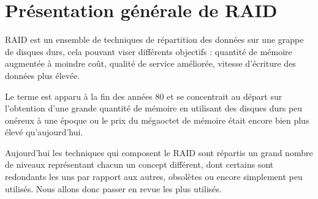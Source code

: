 \section{Présentation générale de RAID}

RAID est un ensemble de techniques de répartition des données sur une grappe de disques durs, cela pouvant viser différents objectifs : quantité de mémoire augmentée à moindre coût, qualité de service améliorée, vitesse d'écriture des données plus élevée. 

Le terme est apparu à la fin des années 80 et se concentrait au départ sur l'obtention d'une grande quantité de mémoire en utilisant des disques durs peu onéreux à une époque ou le prix du mégaoctet de mémoire était encore bien plus élevé qu'aujourd'hui.

Aujourd'hui les techniques qui composent le RAID sont répartis un grand nombre de niveaux représentant chacun un concept différent, dont certains sont redondants les uns par rapport aux autres, obsolètes ou encore simplement peu utilisés. Nous allons donc passer en revue les plus utilisés.